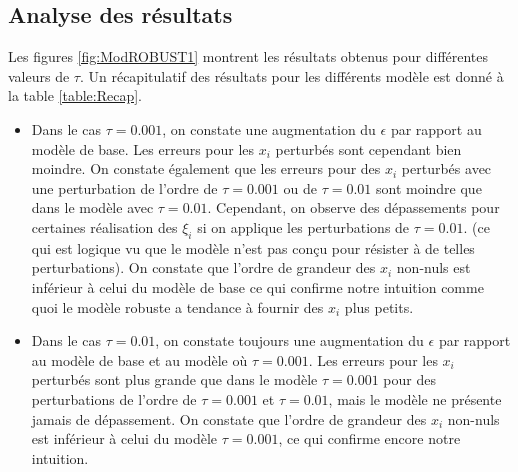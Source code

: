 \subsection{Analyse des résultats}
Les figures \ref{fig:ModROBUST1} montrent les résultats obtenus pour différentes valeurs de $\tau$. Un récapitulatif des résultats pour les différents modèle est donné à la table \ref{table:Recap}.\\
\begin{itemize}
\item Dans le cas $\tau = 0.001$, on constate une augmentation du $\epsilon$ par rapport au modèle de base. Les erreurs pour les $x_i$ perturbés sont cependant bien moindre. On constate également que les erreurs pour des $x_i$ perturbés avec une perturbation de l'ordre de $\tau=0.001$ ou de $\tau = 0.01$ sont moindre que dans le modèle avec $\tau=0.01$. Cependant, on observe des dépassements pour certaines réalisation des $\xi_i$ si on applique les perturbations de $\tau=0.01$. (ce qui est logique vu que le modèle n'est pas conçu pour résister à de telles perturbations). On constate que l'ordre de grandeur des $x_i$ non-nuls est inférieur à celui du modèle de base ce qui confirme notre intuition comme quoi le modèle robuste a tendance à fournir des $x_i$ plus petits.\\ 
 \item Dans le cas $\tau = 0.01$, on constate toujours une augmentation du $\epsilon$ par rapport au modèle de base et au modèle où $\tau = 0.001$. Les erreurs pour les $x_i$ perturbés sont plus grande que dans le modèle $\tau=0.001$ pour des perturbations de l'ordre de $\tau = 0.001$ et $\tau=0.01$, mais le modèle ne présente jamais de dépassement. On constate que l'ordre de grandeur des $x_i$ non-nuls est inférieur à celui du modèle $\tau=0.001$, ce qui confirme encore notre intuition.
\end{itemize}

